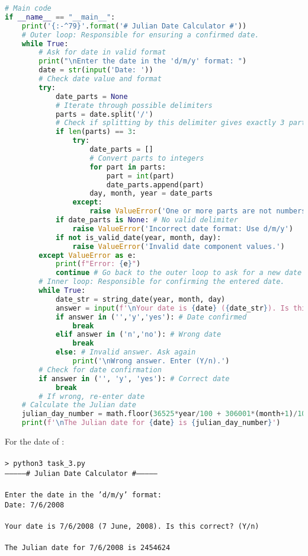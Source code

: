 \documentclass[a4paper,12pt]{article}
\DeclareRobustCommand{\regular}{\fontseries{m}\selectfont}
\DeclareRobustCommand{\sbold}{\fontseries{sb}\selectfont}
\DeclareRobustCommand{\bold}{\fontseries{b}\selectfont}
\newcommand{\rcode}[1]{\texttt{\fontsize{11}{13}\selectfont#1}}
\newcommand{\bcode}[1]{\texttt{\fontsize{11}{13}\selectfont\bold#1}}
\newenvironment{solution}{}{}
\begin{document}
\begin{enumerate}
\begin{solution}
\begin{lstlisting}[language=python]
# Main code
if __name__ == "__main__":
    print('{:-^79}'.format('# Julian Date Calculator #'))
    # Outer loop: Responsible for ensuring a confirmed date.
    while True:
        # Ask for date in valid format
        print("\nEnter the date in the 'd/m/y' format: ")
        date = str(input('Date: '))
        # Check date value and format
        try:
            date_parts = None
            # Iterate through possible delimiters
            parts = date.split('/')
            # Check if splitting by this delimiter gives exactly 3 parts
            if len(parts) == 3:
                try:
                    date_parts = []
                    # Convert parts to integers
                    for part in parts:
                        part = int(part)
                        date_parts.append(part)
                    day, month, year = date_parts
                except:
                    raise ValueError('One or more parts are not numbers.')
            if date_parts is None: # No valid delimiter
                raise ValueError('Incorrect date format: Use d/m/y')
            if not is_valid_date(year, month, day):
                raise ValueError('Invalid date component values.')
        except ValueError as e:
            print(f"Error: {e}")
            continue # Go back to the outer loop to ask for a new date string
        # Inner loop: Responsible for confirming the entered date.
        while True:
            date_str = string_date(year, month, day)
            answer = input(f'\nYour date is {date} ({date_str}). Is this correct? (Y/n) ').strip().lower()
            if answer in ('','y','yes'): # Date confirmed
                break
            elif answer in ('n','no'): # Wrong date
                break
            else: # Invalid answer. Ask again
                print('\nWrong answer. Enter (Y/n).')
        # Check for date confirmation
        if answer in ('', 'y', 'yes'): # Correct date
            break
        # If wrong, re-enter date
    # Calculate the Julian date
    julian_day_number = math.floor(36525*year/100 + 306001*(month+1)/10000 + day + 1720981)
    print(f'\nThe Julian date for {date} is {julian_day_number}')\end{lstlisting}
  \vspace{1em}For the date of \sbold{7 June, 2008}\regular :\\
  \\\bcode{> python3 task\_3.py}
  \\\rcode{---------------\# Julian Date Calculator \#---------------
  \\\\Enter the date in the 'd/m/y' format:
  \\Date: 7/6/2008
  \\\\Your date is 7/6/2008 (7 June, 2008). Is this correct? (Y/n)
  \\\\The Julian date for 7/6/2008 is 2454624}
  \end{solution}
\end{enumerate}
\end{document}
